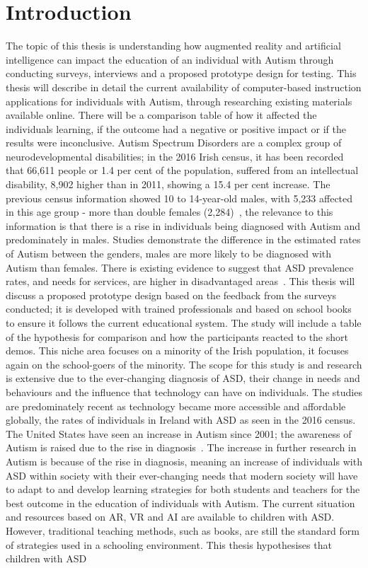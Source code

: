 \chapter{Introduction}
\label{chap:intro}


The topic of this thesis is understanding how augmented reality and artificial intelligence can impact the education of an individual with Autism through conducting surveys, interviews and a proposed prototype design for testing. This thesis will describe in detail the current availability of computer-based instruction applications for individuals with Autism, through researching existing materials available online. There will be a comparison table of how it affected the individuals learning, if the outcome had a negative or positive impact or if the results were inconclusive. Autism Spectrum Disorders are a complex group of neurodevelopmental disabilities; in the 2016 Irish census, it has been recorded that 66,611 people or 1.4 per cent of the population, suffered from an intellectual disability, 8,902 higher than in 2011, showing a 15.4 per cent increase. The previous census information showed 10 to 14-year-old males, with 5,233 affected in this age group - more than double females (2,284)~\cite{Reference1}, the relevance to this information is that there is a rise in individuals being diagnosed with Autism and predominately in males. Studies demonstrate the difference in the estimated rates of Autism between the genders, males are more likely to be diagnosed with Autism than females. There is existing evidence to suggest that ASD prevalence rates, and needs for services, are higher in disadvantaged areas~\cite{Reference2}. This thesis will discuss a proposed prototype design based on the feedback from the surveys conducted; it is developed with trained professionals and based on school books to ensure it follows the current educational system. The study will include a table of the hypothesis for comparison and how the participants reacted to the short demos. This niche area focuses on a minority of the Irish population, it focuses again on the school-goers of the minority. The scope for this study is and research is extensive due to the ever-changing diagnosis of ASD, their change in needs and behaviours and the influence that technology can have on individuals. The studies are predominately recent as technology became more accessible and affordable globally, the rates of individuals in Ireland with ASD as seen in the 2016 census. The United States have seen an increase in Autism since 2001; the awareness of Autism is raised due to the rise in diagnosis~\cite{Reference3}. The increase in further research in Autism is because of the rise in diagnosis, meaning an increase of individuals with ASD within society with their ever-changing needs that modern society will have to adapt to and develop learning strategies for both students and teachers for the best outcome in the education of individuals with Autism. The current situation and resources based on AR, VR and AI are available to children with ASD. However, traditional teaching methods, such as books, are still the standard form of strategies used in a schooling environment. This thesis hypothesises that children with ASD 